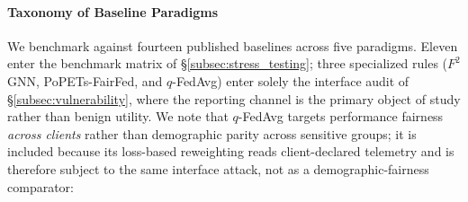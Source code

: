 \paragraph{Taxonomy of Baseline Paradigms}
We benchmark \MethodName{} against fourteen published baselines across five paradigms. Eleven enter the benchmark matrix of \S\ref{subsec:stress_testing}; three specialized rules ($F^2$GNN, PoPETs-FairFed, and $q$-FedAvg) enter solely the interface audit of \S\ref{subsec:vulnerability}, where the reporting channel is the primary object of study rather than benign utility. We note that $q$-FedAvg targets performance fairness \emph{across clients} rather than demographic parity across sensitive groups; it is included because its loss-based reweighting reads client-declared telemetry and is therefore subject to the same interface attack, not as a demographic-fairness comparator:
